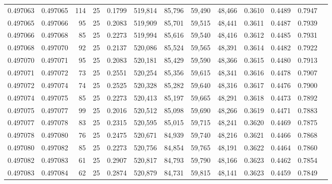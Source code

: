 \begin{tabular}{rrrrrrrrrrrrr}
0.497063 & 0.497065 &   114 &  25 &                                     0.1799 & 519,814 &  85,796 &  59,490 &  48,466 & 0.3610 & 0.4489 & 0.7947 \\
0.497065 & 0.497066 &    95 &  25 &                                     0.2083 & 519,909 &  85,701 &  59,515 &  48,441 & 0.3611 & 0.4487 & 0.7939 \\
0.497066 & 0.497068 &    85 &  25 &                                     0.2273 & 519,994 &  85,616 &  59,540 &  48,416 & 0.3612 & 0.4485 & 0.7931 \\
0.497068 & 0.497070 &    92 &  25 &                                     0.2137 & 520,086 &  85,524 &  59,565 &  48,391 & 0.3614 & 0.4482 & 0.7922 \\
0.497070 & 0.497071 &    95 &  25 &                                     0.2083 & 520,181 &  85,429 &  59,590 &  48,366 & 0.3615 & 0.4480 & 0.7913 \\
0.497071 & 0.497072 &    73 &  25 &                                     0.2551 & 520,254 &  85,356 &  59,615 &  48,341 & 0.3616 & 0.4478 & 0.7907 \\
0.497072 & 0.497074 &    74 &  25 &                                     0.2525 & 520,328 &  85,282 &  59,640 &  48,316 & 0.3617 & 0.4476 & 0.7900 \\
0.497074 & 0.497075 &    85 &  25 &                                     0.2273 & 520,413 &  85,197 &  59,665 &  48,291 & 0.3618 & 0.4473 & 0.7892 \\
0.497075 & 0.497077 &    99 &  25 &                                     0.2016 & 520,512 &  85,098 &  59,690 &  48,266 & 0.3619 & 0.4471 & 0.7883 \\
0.497077 & 0.497078 &    83 &  25 &                                     0.2315 & 520,595 &  85,015 &  59,715 &  48,241 & 0.3620 & 0.4469 & 0.7875 \\
0.497078 & 0.497080 &    76 &  25 &                                     0.2475 & 520,671 &  84,939 &  59,740 &  48,216 & 0.3621 & 0.4466 & 0.7868 \\
0.497080 & 0.497082 &    85 &  25 &                                     0.2273 & 520,756 &  84,854 &  59,765 &  48,191 & 0.3622 & 0.4464 & 0.7860 \\
0.497082 & 0.497083 &    61 &  25 &                                     0.2907 & 520,817 &  84,793 &  59,790 &  48,166 & 0.3623 & 0.4462 & 0.7854 \\
0.497083 & 0.497084 &    62 &  25 &                                     0.2874 & 520,879 &  84,731 &  59,815 &  48,141 & 0.3623 & 0.4459 & 0.7849 \\

\end{tabular}
